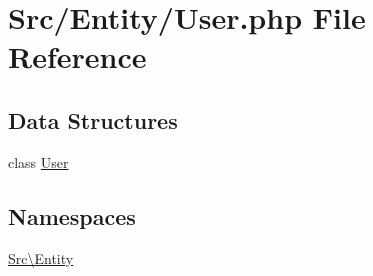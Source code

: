 \hypertarget{_user_8php}{}\section{Src/\+Entity/\+User.php File Reference}
\label{_user_8php}
\subsection*{Data Structures}
\begin{DoxyCompactItemize}
\item 
class \hyperlink{class_src_1_1_entity_1_1_user}{User}
\end{DoxyCompactItemize}
\subsection*{Namespaces}
\begin{DoxyCompactItemize}
\item 
 \hyperlink{namespace_src_1_1_entity}{Src\textbackslash{}\+Entity}
\end{DoxyCompactItemize}
